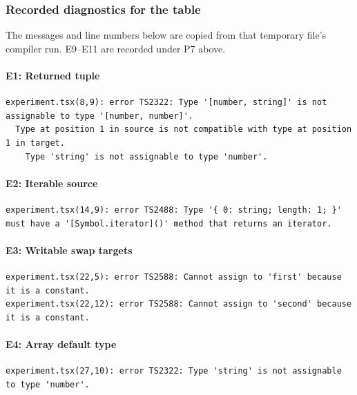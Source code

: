 \documentclass[
  11pt,
]{article}
\let\originalparagraph\paragraph
\renewcommand{\paragraph}[1]{\originalparagraph{#1}\mbox{}}
\begin{document}
\subsubsection{Recorded diagnostics for the
table}\label{recorded-diagnostics-for-the-table}

The messages and line numbers below are copied from that temporary
file's compiler run. E9--E11 are recorded under P7 above.

\paragraph{E1: Returned tuple}\label{e1-returned-tuple}

\begin{lstlisting}
experiment.tsx(8,9): error TS2322: Type '[number, string]' is not assignable to type '[number, number]'.
  Type at position 1 in source is not compatible with type at position 1 in target.
    Type 'string' is not assignable to type 'number'.
\end{lstlisting}

\paragraph{E2: Iterable source}\label{e2-iterable-source}

\begin{lstlisting}
experiment.tsx(14,9): error TS2488: Type '{ 0: string; length: 1; }' must have a '[Symbol.iterator]()' method that returns an iterator.
\end{lstlisting}

\paragraph{E3: Writable swap targets}\label{e3-writable-swap-targets}

\begin{lstlisting}
experiment.tsx(22,5): error TS2588: Cannot assign to 'first' because it is a constant.
experiment.tsx(22,12): error TS2588: Cannot assign to 'second' because it is a constant.
\end{lstlisting}

\paragraph{E4: Array default type}\label{e4-array-default-type}

\begin{lstlisting}
experiment.tsx(27,10): error TS2322: Type 'string' is not assignable to type 'number'.
\end{lstlisting}
\end{document}
